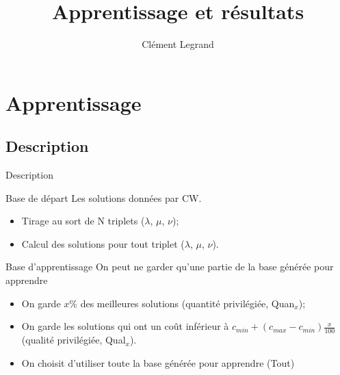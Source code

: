\documentclass{beamer}
\title{Apprentissage et résultats}
\author{Clément Legrand}
\begin{document}
\begin{frame}[plain]
\titlepage
\end{frame}

\section{Apprentissage}

\subsection{Description}

\begin{frame}{Description}
\begin{block}{Base de départ}
Les solutions données par CW.
\begin{itemize}
\item Tirage au sort de N triplets ($\lambda$, $\mu$, $\nu$);
\item Calcul des solutions pour tout triplet ($\lambda$, $\mu$, $\nu$).
\end{itemize}
\end{block}

\begin{block}{Base d'apprentissage}
On peut ne garder qu'une partie de la base générée pour apprendre
\begin{itemize}
\item On garde $x\%$ des meilleures solutions (quantité privilégiée, Quan$_{x}$);
\item On garde les solutions qui ont un coût inférieur à $c_{min} + (c_{max}-c_{min})\frac{x}{100}$ (qualité privilégiée, Qual$_{x}$).
\item On choisit d'utiliser toute la base générée pour apprendre (Tout)
\end{itemize}
\end{block}
\end{frame}
\end{document}
